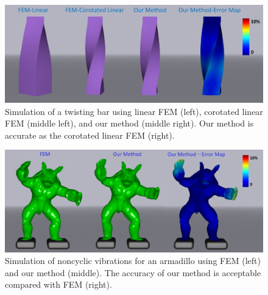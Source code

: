 \begin{figure}[t]
  \centering
  \includegraphics[width=\linewidth]{../figs/revision/demo_bar_twist_vs_fem.png}
  \caption{\label{fig:11}
  Simulation of a twisting bar using linear FEM (left), corotated linear FEM (middle left), and our method (middle right). Our method is accurate as the corotated linear FEM (right).
}
\end{figure}
\begin{figure}[t]
  \centering
  \includegraphics[width=\linewidth]{../figs/revision/demo_armadillo_vs_fem_2.png}
  \caption{\label{fig:12}
  Simulation of noncyclic vibrations for an armadillo using FEM (left) and our method (middle). The accuracy of our method is acceptable compared with FEM (right).
}
\end{figure}
